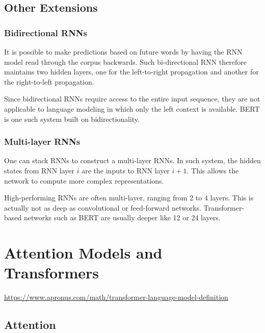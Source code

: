 \documentclass[
]{book}
\begin{document}
\hypertarget{other-extensions}{%
\section{Other Extensions}\label{other-extensions}}

\hypertarget{bidirectional-rnns}{%
\subsection{Bidirectional RNNs}\label{bidirectional-rnns}}

It is possible to make predictions based on future words by having the RNN model read through the corpus backwards. Such bi-directional RNN therefore maintains two hidden layers, one for the left-to-right propagation and another for the right-to-left propagation.

Since bidirectional RNNs require access to the entire input sequence, they are not applicable to language modeling in which only the left context is available. BERT is one such system built on bidirectionality.

\hypertarget{multi-layer-rnns}{%
\subsection{Multi-layer RNNs}\label{multi-layer-rnns}}

One can stack RNNs to construct a multi-layer RNNs. In such system, the hidden states from RNN layer \(i\) are the inputs to RNN layer \(i+1\). This allows the network to compute more complex representations.

High-performing RNNs are often multi-layer, ranging from 2 to 4 layers. This is actually not as deep as convolutional or feed-forward networks. Transformer-based networks such as BERT are usually deeper like 12 or 24 layers.

\hypertarget{attention-models-and-transformers}{%
\chapter{Attention Models and Transformers}\label{attention-models-and-transformers}}

\url{https://www.apronus.com/math/transformer-language-model-definition}

\hypertarget{attention}{%
\section{Attention}\label{attention}}
\end{document}
